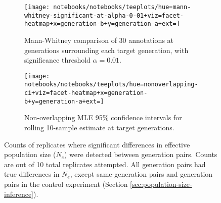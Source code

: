 \begin{figure}
  \centering

  \begin{subfigure}{\textwidth}
    \begin{minipage}{0.7\textwidth}
      \texttt{[image: notebooks/notebooks/teeplots/hue=mann-whitney-significant-at-alpha-0-01+viz=facet-heatmap+x=generation-b+y=generation-a+ext=]}
    \end{minipage}%
    \begin{minipage}{0.25\textwidth}
      \caption{Mann-Whitney comparison of 30 annotations at generations surrounding each target generation, with significance threshold $\alpha = 0.01$.}
      \label{fig:ne-detection-matrix:mann-whitney}
    \end{minipage}
  \end{subfigure}

  \vspace{1em} %

  \begin{subfigure}{\textwidth}
    \begin{minipage}{0.7\textwidth}
      \texttt{[image: notebooks/notebooks/teeplots/hue=nonoverlapping-ci+viz=facet-heatmap+x=generation-b+y=generation-a+ext=]}
    \end{minipage}%
    \begin{minipage}{0.25\textwidth}
      \caption{Non-overlapping MLE 95\% confidence intervals for rolling 10-sample estimate at target generations.}
      \label{fig:ne-detection-matrix:ci}
    \end{minipage}
  \end{subfigure}

  \caption{Counts of replicates where significant differences in effective population size ($N_e$) were detected between generation pairs.
  Counts are out of 10 total replicates attempted.
  All generation pairs had true differences in $N_e$, except same-generation pairs and generation pairs in the control experiment (Section \ref{sec:population-size-inference}).
  }
  \label{fig:ne-detection-matrix}
\end{figure}

%
